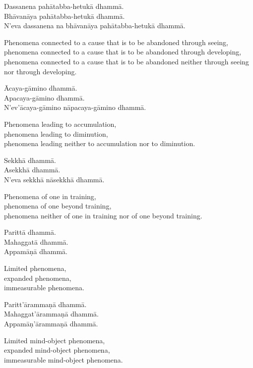Dassanena pahātabba-hetukā dhammā.\\
Bhāvanāya pahātabba-hetukā dhammā.\\
N'eva dassanena na bhāvanāya pahātabba-hetukā dhammā.

\begin{english}
  Phenomena connected to a cause that is to be abandoned through seeing,\\
  phenomena connected to a cause that is to be abandoned through developing,\\
  phenomena connected to a cause that is to be abandoned neither through seeing
  nor through developing.
\end{english}

Ācaya-gāmino dhammā.\\
Apacaya-gāmino dhammā.\\
N'ev'ācaya-gāmino nāpacaya-gāmino dhammā.

\begin{english}
  Phenomena leading to accumulation,\\
  phenomena leading to diminution,\\
  phenomena leading neither to accumulation nor to diminution.
\end{english}

Sekkhā dhammā.\\
Asekkhā dhammā.\\
N'eva sekkhā nāsekkhā dhammā.

\begin{english}
  Phenomena of one in training,\\
  phenomena of one beyond training,\\
  phenomena neither of one in training nor of one beyond training.
\end{english}

Parittā dhammā.\\
Mahaggatā dhammā.\\
Appamāṇā dhammā.

\begin{english}
  Limited phenomena,\\
  expanded phenomena,\\
  immeasurable phenomena.
\end{english}

Paritt'ārammaṇā dhammā.\\
Mahaggat'ārammaṇā dhammā.\\
Appamāṇ'ārammaṇā dhammā.

\begin{english}
  Limited mind-object phenomena,\\
  expanded mind-object phenomena,\\
  immeasurable mind-object phenomena.
\end{english}

